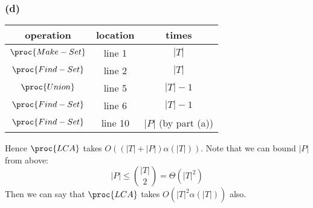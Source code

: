 \subsubsection*{(d)}

\begin{tabular}{c|c|c}
    operation & location & times \\
    \hline
    $\proc{Make-Set}$ & line 1 & $|T|$ \\
    $\proc{Find-Set}$ & line 2 & $|T|$ \\
    $\proc{Union}$ & line 5 & $|T| - 1$ \\
    $\proc{Find-Set}$ & line 6 & $|T| - 1$ \\
    $\proc{Find-Set}$ & line 10 & $|P|$ (by part (a)) \\
\end{tabular}

Hence $\proc{LCA}$ takes $O((|T| + |P|) \alpha(|T|))$.
Note that we can bound $|P|$ from above:
\begin{equation*}
    |P| \leq \binom{|T|}{2} = \Theta(|T|^2)
\end{equation*}
Then we can say that $\proc{LCA}$ takes $O(|T|^2 \alpha(|T|))$ also.


